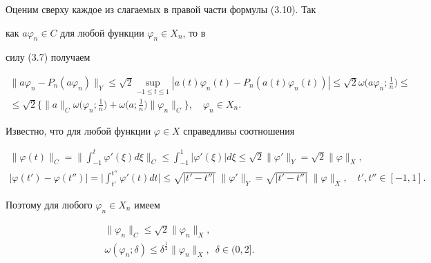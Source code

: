 Оценим сверху каждое из слагаемых в правой части формулы (3.10). Так 


как $a\varphi_n\in C$ для любой функции $\varphi_n\in X_n$, то в 


силу (3.7) получаем


\begin{multline}


\| a\varphi_n-P_n(a\varphi_n)\|_Y\leq\sqrt{2}\sup_{-1\leq t


\leq 1}| a(t)\varphi_n(t)-P_n(a(t)\varphi_n(t))|\leq\sqrt{2}


\omega\bigg(a\varphi_n;\frac{1}{n}\bigg)\leq \\


%


\leq\sqrt{2}\bigg\{\| a\|_C\omega\bigg(\varphi_n;\frac{1}{n}\bigg)+


\omega\bigg(a;\frac{1}{n}\bigg)\|\varphi_n\|_C\bigg\},\quad\varphi_n\in X_n. 


\end{multline}





Известно, что для любой функции $\varphi\in X$ справедливы соотношения


\begin{gather*}


\|\varphi(t)\|_C=\bigg\|\int_{-1}^t\varphi'(\xi)d\xi\bigg\|_C\leq


\int_{-1}^1|\varphi'(\xi)| d\xi\leq\sqrt{2}\|\varphi'


\|_Y=\sqrt{2}\|\varphi\|_X, \\


%


|\varphi(t')-\varphi(t'')|=\bigg|\int_{t'}^{t''}\varphi'(t)dt


\bigg|\leq\sqrt{| t'-t''|}\; \|\varphi'\|_Y=\sqrt{| t'-t''


|}\; \|\varphi\|_X, \quad t', t''\in[-1, 1]. 


\end{gather*}


Поэтому для любого $\varphi_n\in X_n$ имеем


\begin{gather}


\|\varphi_n\|_C\leq\sqrt{2}\|\varphi_n\|_X, \\


%


\omega(\varphi_n;\delta)\leq\delta^{\frac{1}{2}}\|\varphi_n\|_X, \ \;


\delta\in(0, 2]. 


\end{gather}


